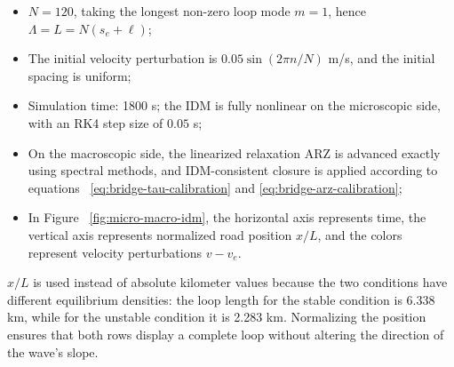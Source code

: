 \documentclass[11pt,a4paper,openany]{book}
\numberwithin{equation}{chapter}
\numberwithin{figure}{chapter}
\numberwithin{table}{chapter}
\begin{document}
\begin{itemize}[leftmargin=1.4em,itemsep=3pt]
\item




 $N=120$, taking the longest non-zero loop mode $m=1$, hence $\Lambda=L=N(s_e+\ell)$;







\item




 The initial velocity perturbation is $0.05\sin(2\pi n/N)$ m/s, and the initial spacing is uniform;







\item




 Simulation time: 1800 s; the IDM is fully nonlinear on the microscopic side, with an RK4 step size of $0.05$ s;







\item




 On the macroscopic side, the linearized relaxation ARZ is advanced exactly using spectral methods, and IDM-consistent closure is applied according to equations ~\eqref{eq:bridge-tau-calibration} and \eqref{eq:bridge-arz-calibration};







\item




 In Figure ~\ref{fig:micro-macro-idm}, the horizontal axis represents time, the vertical axis represents normalized road position $x/L$, and the colors represent velocity perturbations $v-v_e$.


\end{itemize}


$x/L$ is used instead of absolute kilometer values because the two conditions have different equilibrium densities: the loop length for the stable condition is 6.338 km, while for the unstable condition it is 2.283 km. Normalizing the position ensures that both rows display a complete loop without altering the direction of the wave’s slope.
\end{document}
